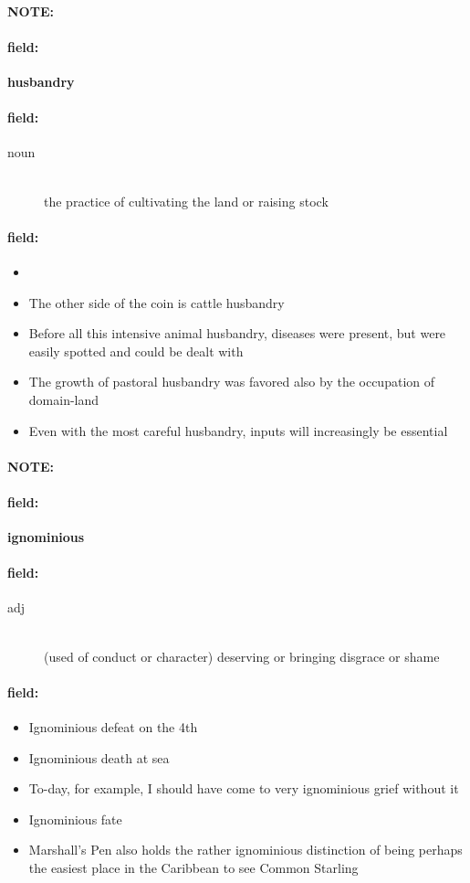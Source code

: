 \documentclass[12pt]{article}
\newenvironment{note}{\paragraph{NOTE:}}{}
\newenvironment{field}{\paragraph{field:}}{}
\begin{document}
\begin{note}
\begin{field}
\textbf{\large husbandry}
\end{field}


\begin{field}
\begin{description}
\item[noun] \hfill \\ 
the practice of cultivating the land or raising stock

\end{description}
\end{field}

\begin{field}
\begin{itemize}
\item 
\item The other side of the coin is cattle husbandry
\item Before all this intensive animal husbandry, diseases were present, but were easily spotted and could be dealt with
\item The growth of pastoral husbandry was favored also by the occupation of domain-land
\item Even with the most careful husbandry, inputs will increasingly be essential
\end{itemize}
\end{field}
\end{note}
\begin{note}
\begin{field}
\textbf{\large ignominious}
\end{field}


\begin{field}
\begin{description}
\item[adj] \hfill \\ 
(used of conduct or character) deserving or bringing disgrace or shame

\end{description}
\end{field}

\begin{field}
\begin{itemize}
\item Ignominious defeat on the 4th
\item Ignominious death at sea
\item To-day, for example, I should have come to very ignominious grief without it
\item Ignominious fate
\item Marshall's Pen also holds the rather ignominious distinction of being perhaps the easiest place in the Caribbean to see Common Starling
\end{itemize}
\end{field}
\end{note}
\end{document}
